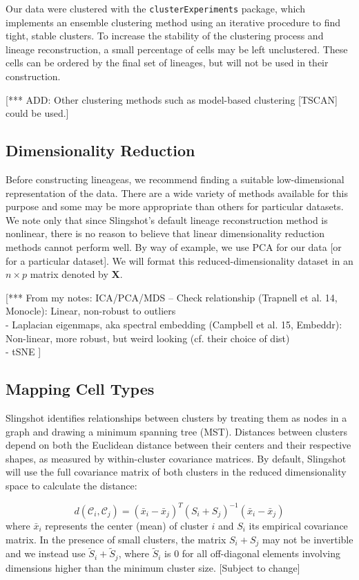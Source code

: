 \documentclass[11pt]{article}\usepackage[]{graphicx}\usepackage[]{color}
\begin{document}
Our data were clustered with the \texttt{clusterExperiments} package, which implements an ensemble clustering method using an iterative procedure to find tight, stable clusters. To increase the stability of the clustering process and lineage reconstruction, a small percentage of cells may be left unclustered. These cells can be ordered by the final set of lineages, but will not be used in their construction.

[*** ADD: Other clustering methods such as model-based clustering [TSCAN] could be used.]

\subsection{Dimensionality Reduction}
Before constructing lineageas, we recommend finding a suitable low-dimensional representation of the data. There are a wide variety of methods available for this purpose and some may be more appropriate than others for particular datasets. We note only that since Slingshot's default lineage reconstruction method is nonlinear, there is no reason to believe that linear dimensionality reduction methods cannot perform well. By way of example, we use PCA for our data [or for a particular dataset]. We will format this reduced-dimensionality dataset in an $n \times p$ matrix denoted by $\mathbf{X}$.

[*** From my notes: ICA/PCA/MDS -- Check relationship (Trapnell et al. 14, Monocle): Linear, non-robust to outliers\\
- Laplacian eigenmaps, aka spectral embedding (Campbell et al. 15, Embeddr): Non-linear, more robust, but weird looking (cf. their choice of dist)\\
- tSNE 
]

\subsection{Mapping Cell Types}
Slingshot identifies relationships between clusters by treating them as nodes in a graph and drawing a minimum spanning tree (MST). Distances between clusters depend on both the Euclidean distance between their centers and their respective shapes, as measured by within-cluster covariance matrices. By default, Slingshot will use the full covariance matrix of both clusters in the reduced dimensionality space to calculate the distance:

$$d(\mathcal{C}_i,\mathcal{C}_j) = (\bar{x}_i - \bar{x}_j)^T (S_i + S_j)^{-1} (\bar{x}_i - \bar{x}_j)$$
where $\bar{x}_i$ represents the center (mean) of cluster $i$ and $S_i$ its empirical covariance matrix. In the presence of small clusters, the matrix $S_i + S_j$ may not be invertible and we instead use $\tilde{S}_i + \tilde{S}_j$, where $\tilde{S}_i$ is $0$ for all off-diagonal elements involving dimensions higher than the minimum cluster size. [Subject to change]
\end{document}
